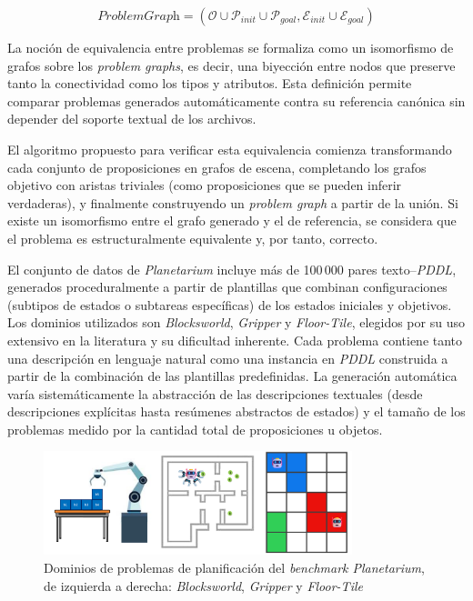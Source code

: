 \[
\textit{ProblemGraph} = (\mathcal{O} \cup \mathcal{P}_{\textit{init}} \cup \mathcal{P}_{\textit{goal}}, \mathcal{E}_{\textit{init}} \cup \mathcal{E}_{\textit{goal}})
\]

La noción de equivalencia entre problemas se formaliza como un isomorfismo de grafos sobre los \textit{problem graphs}, es decir, una biyección entre nodos que preserve tanto la conectividad como los tipos y atributos. Esta definición permite comparar problemas generados automáticamente contra su referencia canónica sin depender del soporte textual de los archivos.

El algoritmo propuesto para verificar esta equivalencia comienza transformando cada conjunto de proposiciones en grafos de escena, completando los grafos objetivo con aristas triviales (como proposiciones que se pueden inferir verdaderas), y finalmente construyendo un \textit{problem graph} a partir de la unión. Si existe un isomorfismo entre el grafo generado y el de referencia, se considera que el problema es estructuralmente equivalente y, por tanto, correcto.

El conjunto de datos de \textit{Planetarium} incluye más de 100\,000 pares texto--\textit{PDDL}, generados proceduralmente a partir de plantillas que combinan configuraciones (subtipos de estados o subtareas específicas) de los estados iniciales y objetivos. Los dominios utilizados son \textit{Blocksworld}, \textit{Gripper} y \textit{Floor-Tile}, elegidos por su uso extensivo en la literatura y su dificultad inherente. Cada problema contiene tanto una descripción en lenguaje natural como una instancia en \textit{PDDL} construida a partir de la combinación de las plantillas predefinidas. La generación automática varía sistemáticamente la abstracción de las descripciones textuales (desde descripciones explícitas hasta resúmenes abstractos de estados) y el tamaño de los problemas medido por la cantidad total de proposiciones u objetos.

\begin{figure}[H]
\centering
\includegraphics[width=0.8\textwidth]{Graphics/domains.png}
\caption{Dominios de problemas de planificación del \textit{benchmark Planetarium}, de izquierda a derecha: \textit{Blocksworld}, \textit{Gripper} y \textit{Floor-Tile}}
\label{fig:domains}
\end{figure}

